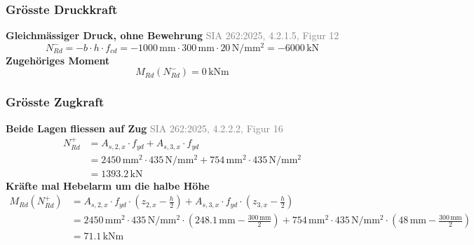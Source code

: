 \documentclass[11pt,a4paper]{article}
\newcommand{\normref}[1]{{\small\textcolor{gray}{#1}}}
\begin{document}
\subsubsection{Grösste Druckkraft}
\noindent\textbf{Gleichmässiger Druck, ohne Bewehrung} \hfill \normref{SIA 262:2025, 4.2.1.5, Figur 12}
\begin{equation*}
N_{Rd}^{-} = -b \cdot h \cdot f_{cd} = -1000\,\mathrm{mm} \cdot 300\,\mathrm{mm} \cdot 20\,\mathrm{N}/\mathrm{mm}^{2} = -6000\,\mathrm{kN}
\end{equation*}
\noindent\textbf{Zugehöriges Moment}
\begin{equation*}
M_{Rd}(N_{Rd}^{-}) = 0\,\mathrm{kNm}
\end{equation*}
\subsubsection{Grösste Zugkraft}
\noindent\textbf{Beide Lagen fliessen auf Zug} \hfill \normref{SIA 262:2025, 4.2.2.2, Figur 16}
\begin{equation*}
\begin{aligned}
  N_{Rd}^{+} &= A_{s,2,x} \cdot f_{yd} + A_{s,3,x} \cdot f_{yd} \\
  &= 2450\,\mathrm{mm}^{2} \cdot 435\,\mathrm{N}/\mathrm{mm}^{2} + 754\,\mathrm{mm}^{2} \cdot 435\,\mathrm{N}/\mathrm{mm}^{2} \\
  &= 1393.2\,\mathrm{kN}
\end{aligned}
\end{equation*}
\noindent\textbf{Kräfte mal Hebelarm um die halbe Höhe}
\begin{equation*}
\begin{aligned}
  M_{Rd}(N_{Rd}^{+}) &= A_{s,2,x} \cdot f_{yd} \cdot \left(z_{2,x} - \tfrac{h}{2}\right) + A_{s,3,x} \cdot f_{yd} \cdot \left(z_{3,x} - \tfrac{h}{2}\right) \\
  &= 2450\,\mathrm{mm}^{2} \cdot 435\,\mathrm{N}/\mathrm{mm}^{2} \cdot \left(248.1\,\mathrm{mm} - \tfrac{300\,\mathrm{mm}}{2}\right) + 754\,\mathrm{mm}^{2} \cdot 435\,\mathrm{N}/\mathrm{mm}^{2} \cdot \left(48\,\mathrm{mm} - \tfrac{300\,\mathrm{mm}}{2}\right) \\
  &= 71.1\,\mathrm{kNm}
\end{aligned}
\end{equation*}
\end{document}
